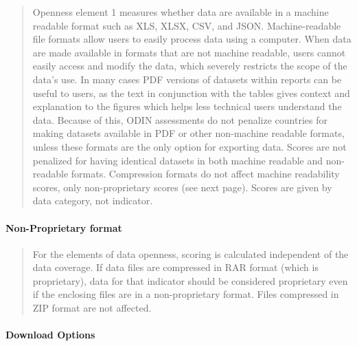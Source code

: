\documentclass[]{article}
\let\oldparagraph\paragraph
\renewcommand{\paragraph}[1]{\oldparagraph{#1}\mbox{}}
\begin{document}
\begin{quote}
Openness element 1 measures whether data are available in a machine
readable format such as XLS, XLSX, CSV, and JSON. Machine-readable file
formats allow users to easily process data using a computer. When data
are made available in formats that are not machine readable, users
cannot easily access and modify the data, which severely restricts the
scope of the data's use. In many cases PDF versions of datasets within
reports can be useful to users, as the text in conjunction with the
tables gives context and explanation to the figures which helps less
technical users understand the data. Because of this, ODIN assessments
do not penalize countries for making datasets available in PDF or other
non-machine readable formats, unless these formats are the only option
for exporting data. Scores are not penalized for having identical
datasets in both machine readable and non-readable formats. Compression
formats do not affect machine readability scores, only non-proprietary
scores (see next page). Scores are given by data category, not
indicator.
\end{quote}

\hypertarget{non-proprietary-format}{%
\paragraph{Non-Proprietary format}\label{non-proprietary-format}}

\begin{quote}
For the elements of data openness, scoring is calculated independent of
the data coverage. If data files are compressed in RAR format (which is
proprietary), data for that indicator should be considered proprietary
even if the enclosing files are in a non-proprietary format. Files
compressed in ZIP format are not affected.
\end{quote}

\hypertarget{download-options}{%
\paragraph{Download Options}\label{download-options}}
\end{document}
